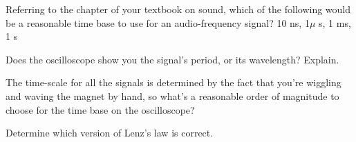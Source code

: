 \prelabquestion  Referring to the chapter of your textbook on sound,
which of the following would be a reasonable time base to
use for an audio-frequency signal? 10 ns, 1$\mu$ s, 1 ms, 1 s

\prelabquestion  Does the oscilloscope show you the signal's period,
or its wavelength? Explain.

\prelabquestion The time-scale for all the signals is determined
by the fact that you're wiggling and waving the magnet by hand,
so what's a reasonable order of magnitude to choose for the
time base on the oscilloscope?

\selfcheck

Determine which version of Lenz's law is correct.
